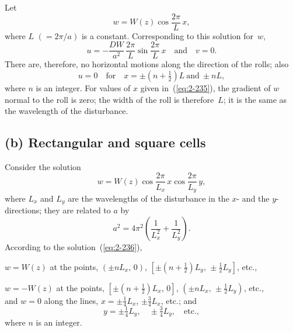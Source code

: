 Let
\begin{equation}
\label{eq:2-233}
w = W(z)\cos\frac{2\pi}{L}\,x,
\end{equation}
where $L$ $(= 2\pi/a)$ is a constant. Corresponding to this solution for~$w$,
\begin{equation}
\label{eq:2-234}
u = -\frac{DW}{a^2}\,\frac{2\pi}{L}\sin\frac{2\pi}{L}\,x \quad\text{and}\quad v = 0.
\end{equation}
There are, therefore, no horizontal motions along the direction of the
rolls; also
\begin{equation}
\label{eq:2-235}
u = 0 \quad\text{for}\quad x = \pm(n+\tfrac{1}{2})L\ \text{and}\ \pm nL,
\end{equation}
where $n$ is an integer. For values of $x$ given in~(\ref{eq:2-235}), the gradient of
$w$ normal to the roll is zero; the width of the roll is therefore~$L$; it is the
same as the wavelength of the disturbance.

\subsection*{(b) Rectangular and square cells}

Consider the solution
\begin{equation}
\label{eq:2-236}
w = W(z)\cos\frac{2\pi}{L_x}\,x\cos\frac{2\pi}{L_y}\,y,
\end{equation}
where $L_x$ and $L_y$ are the wavelengths of the disturbance in the $x$- and
the $y$-directions; they are related to $a$ by
\begin{equation}
\label{eq:2-237}
a^2 = 4\pi^2\!\left(\frac{1}{L_x^2}+\frac{1}{L_y^2}\right)\!.
\end{equation}
According to the solution~(\ref{eq:2-236}),

$w = W(z)$ at the points, $(\pm nL_x,\,0)$, $[\pm(n+\tfrac{1}{2})L_y,\,\pm\tfrac{1}{2}L_y]$, etc.,

$w = -W(z)$ at the points, $[\pm(n+\tfrac{1}{2})L_x,\,0]$, $(\pm nL_x,\,\pm\tfrac{1}{2}L_y)$, etc.,
\begin{equation}
\label{eq:2-238}
\end{equation}
and \quad $w = 0$ along the lines, $x = \pm\tfrac{1}{4}L_x$, $\pm\tfrac{3}{4}L_x$, etc.; and
\begin{equation}
\label{eq:2-239}
y = \pm\tfrac{1}{4}L_y,\quad \pm\tfrac{3}{4}L_y,\quad\text{etc.},
\end{equation}
where $n$ is an integer.

